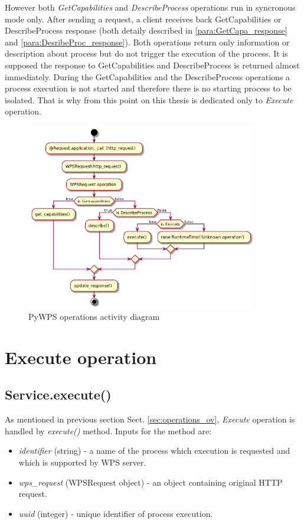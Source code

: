 \documentclass[12pt,a4paper]{article}
\begin{document}
However both \textit{GetCapabilities} and \textit{DescribeProcess} operations run in syncronous mode only. After sending a request,
a client receives back GetCapabilities or DescribeProcess response (both detaily described in \ref{para:GetCapa_response} and \ref{para:DesribeProc_response}). Both operations return only information or description about process but do not trigger the
execution of the process. It is supposed the response to GetCapabilities and DescribeProcess is returned almost immediately.
During the GetCapabilities and the DescribeProcess operations a process execution is not started and therefore there is no
starting process to be isolated. That is why from this point on this thesis is dedicated only to \textit{Execute} operation.

\begin{figure}[h!]
\centering
\includegraphics[width=0.9\textwidth]{img/Diag_operations.png}
\caption{PyWPS operations activity diagram}
\label{fig:Diag_operations}
\end{figure}

\section{Execute operation}
\subsection{Service.execute()}
As mentioned in previous section Sect. \ref{sec:operations_ov}, \textit{Execute} operation is handled by \textit{execute()} method.
Inputs for the method are:
\begin{itemize}
\item \textit{identifier} (string) - a name of the process which execution is requested and which is supported by WPS server.
\item \textit{wps\_request} (WPSRequest object) - an object containing original HTTP request.
\item \textit{uuid} (integer) - unique identifier of process execution.
\end{itemize}
\end{document}
